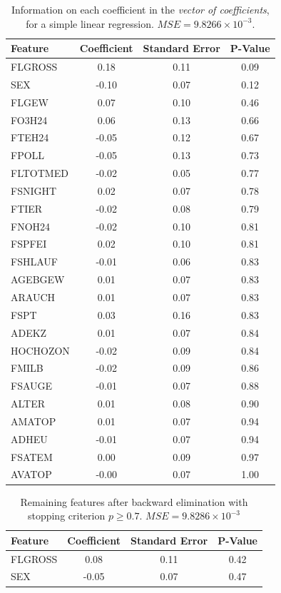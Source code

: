 \documentclass[twoside,twocolumn,10pt]{revtex4-1}
\begin{document}
	\begin{table}[H]
	\center
		\begin{tabular}{l c c c}
		\textbf{Feature} & \textbf{Coefficient}& \textbf{Standard Error} & \textbf{P-Value} \\ 
		\hline
		FLGROSS & 0.18 & 0.11 & 0.09\\
		SEX & -0.10 & 0.07 & 0.12\\
		FLGEW & 0.07 & 0.10 & 0.46\\
		FO3H24 & 0.06 & 0.13 & 0.66\\
		FTEH24 & -0.05 & 0.12 & 0.67\\
		FPOLL & -0.05 & 0.13 & 0.73\\
		FLTOTMED & -0.02 & 0.05 & 0.77\\
		FSNIGHT & 0.02 & 0.07 & 0.78\\
		FTIER & -0.02 & 0.08 & 0.79\\
		FNOH24 & -0.02 & 0.10 & 0.81\\
		FSPFEI & 0.02 & 0.10 & 0.81\\
		FSHLAUF & -0.01 & 0.06 & 0.83\\
		AGEBGEW & 0.01 & 0.07 & 0.83\\
		ARAUCH & 0.01 & 0.07 & 0.83\\
		FSPT & 0.03 & 0.16 & 0.83\\
		ADEKZ & 0.01 & 0.07 & 0.84\\
		HOCHOZON & -0.02 & 0.09 & 0.84\\
		FMILB & -0.02 & 0.09 & 0.86\\
		FSAUGE & -0.01 & 0.07 & 0.88\\
		ALTER & 0.01 & 0.08 & 0.90\\
		AMATOP & 0.01 & 0.07 & 0.94\\
		ADHEU & -0.01 & 0.07 & 0.94\\
		FSATEM & 0.00 & 0.09 & 0.97\\
		AVATOP & -0.00 & 0.07 & 1.00
		\end{tabular}
		\caption{Information on each coefficient in the \textit{vector of coefficients}, for a simple linear regression.  $MSE = 	9.8266 \times 10^{-3}$.\label{table_2}}
	\end{table}
	
		\begin{table}[H]
	\center
		\begin{tabular}{l c c c}
		\textbf{Feature} & \textbf{Coefficient}& \textbf{Standard Error} & \textbf{P-Value} \\ 
		\hline
		FLGROSS & 0.08 & 0.11 & 0.42\\
		SEX & -0.05 & 0.07 & 0.47
		\end{tabular}
	\caption{Remaining features after backward elimination with stopping criterion $p \geq 0.7$. $MSE = 9.8286 \times 10^{-3}$\label{table_3}}
	\end{table}
	
\end{document}

